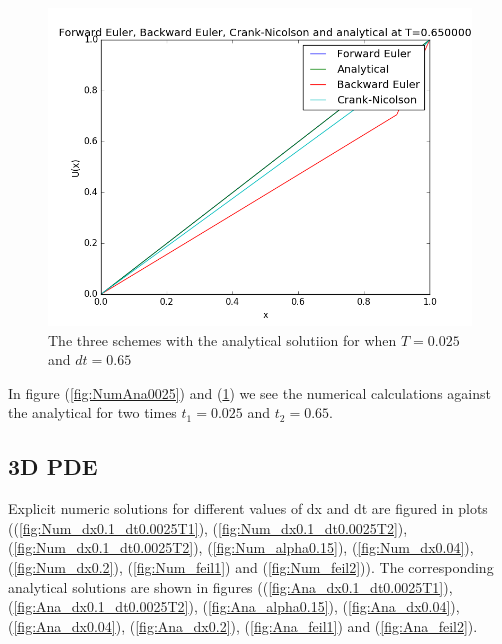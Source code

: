 \documentclass[a4paper,10pt]{article}
\begin{document}
\begin{figure}
  \includegraphics[scale=0.5]{alldt025analyticalt2}
    \caption{The three schemes with the analytical solutiion for when $T = 0.025$ and $dt = 0.65$}
    \label{fig:NumAna065}
\end{figure}

In figure (\ref{fig:NumAna0025}) and (\ref{fig:NumAna065}) we see the numerical calculations against the analytical for two times $t_1 = 0.025$
and $t_2 = 0.65$.

\subsection{3D PDE}
Explicit numeric solutions for different values of dx and dt are figured in plots ((\ref{fig:Num_dx0.1_dt0.0025T1}), (\ref{fig:Num_dx0.1_dt0.0025T2}), (\ref{fig:Num_dx0.1_dt0.0025T2}), (\ref{fig:Num_alpha0.15}), (\ref{fig:Num_dx0.04}), (\ref{fig:Num_dx0.2}), (\ref{fig:Num_feil1}) and (\ref{fig:Num_feil2})).
The corresponding analytical solutions are shown in figures ((\ref{fig:Ana_dx0.1_dt0.0025T1}), (\ref{fig:Ana_dx0.1_dt0.0025T2}), (\ref{fig:Ana_alpha0.15}), (\ref{fig:Ana_dx0.04}), (\ref{fig:Ana_dx0.04}), (\ref{fig:Ana_dx0.2}), (\ref{fig:Ana_feil1}) and (\ref{fig:Ana_feil2}).
\end{document}
